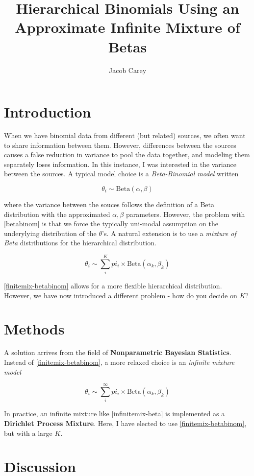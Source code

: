 \documentclass{article}
\begin{document}
\title{Hierarchical Binomials Using an Approximate Infinite Mixture of Betas}
\author{Jacob Carey}

\maketitle

\section{Introduction}

When we have binomial data from different (but related) sources, we often want to share information between them. However, differences between the sources causes a false reduction in variance to pool the data together, and modeling them separately loses information. In this instance, I was interested in the variance between the sources. A typical model choice is a \textit{Beta-Binomial model} written

\begin{equation}\label{betabinom}
\theta_i \sim \text{Beta}(\alpha, \beta)
\end{equation}

where the variance between the souces follows the definition of a Beta distribution with the approximated $\alpha, \beta$ parameters. However, the problem with \eqref{betabinom} is that we force the typically uni-modal assumption on the underylying distribution of the $\theta$'s. A natural extension is to use a \textit{mixture of Beta} distributions for the hierarchical distribution.

\begin{equation}\label{finitemix-betabinom}
\theta_i \sim \sum_i^K pi_i \times \text{Beta}(\alpha_k, \beta_k)
\end{equation}

\eqref{finitemix-betabinom} allows for a more flexible hierarchical distribution. However, we have now introduced a different problem - how do you decide on $K$?

\section{Methods}

A solution arrives from the field of \textbf{Nonparametric Bayesian Statistics}. Instead of \eqref{finitemix-betabinom}, a more relaxed choice is an \textit{infinite mixture model}

\begin{equation}\label{infinitemix-betabinom}
\theta_i \sim \sum_i^{\infty} pi_i \times \text{Beta}(\alpha_k, \beta_k)
\end{equation}

In practice, an infinite mixture like \eqref{infinitemix-beta} is implemented as a \textbf{Dirichlet Process Mixture}. Here, I have elected to use \eqref{finitemix-betabinom}, but with a large $K$.

\section{Discussion}
\end{document}
